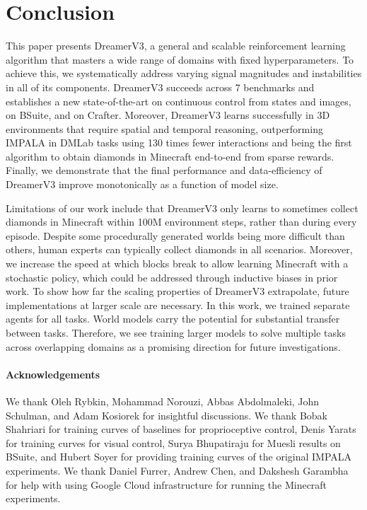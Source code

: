 \section*{Conclusion}
\label{sec:discussion}

This paper presents DreamerV3, a general and scalable reinforcement learning algorithm that masters a wide range of domains with fixed hyperparameters.
To achieve this, we systematically address varying signal magnitudes and instabilities in all of its components. DreamerV3 succeeds across 7 benchmarks and establishes a new state-of-the-art on continuous control from states and images, on BSuite, and on Crafter.
Moreover, DreamerV3 learns successfully in 3D environments that require spatial and temporal reasoning, outperforming IMPALA in DMLab tasks using 130 times fewer interactions and being the first algorithm to obtain diamonds in Minecraft end-to-end from sparse rewards.
Finally, we demonstrate that the final performance and data-efficiency of DreamerV3 improve monotonically as a function of model size.

Limitations of our work include that DreamerV3 only learns to sometimes collect diamonds in Minecraft within 100M environment steps, rather than during every episode.
Despite some procedurally generated worlds being more difficult than others, human experts can typically collect diamonds in all scenarios.
Moreover, we increase the speed at which blocks break to allow learning Minecraft with a stochastic policy, which could be addressed through inductive biases in prior work.
To show how far the scaling properties of DreamerV3 extrapolate, future implementations at larger scale are necessary.
In this work, we trained separate agents for all tasks.
World models carry the potential for substantial transfer between tasks.
Therefore, we see training larger models to solve multiple tasks across overlapping domains as a promising direction for future investigations.

\paragraph{Acknowledgements}
We thank Oleh Rybkin, Mohammad Norouzi, Abbas Abdolmaleki, John Schulman, and Adam Kosiorek for insightful discussions. We thank Bobak Shahriari for training curves of baselines for proprioceptive control, Denis Yarats for training curves for visual control, Surya Bhupatiraju for Muesli results on BSuite, and Hubert Soyer for providing training curves of the original IMPALA experiments. We thank Daniel Furrer, Andrew Chen, and Dakshesh Garambha for help with using Google Cloud infrastructure for running the Minecraft experiments.
